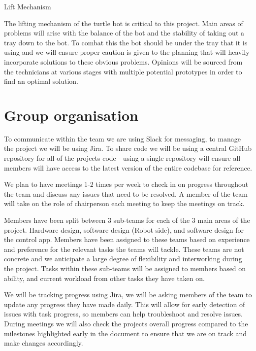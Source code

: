 \documentclass{article}
\begin{document}
Lift Mechanism

The lifting mechanism of the turtle bot is critical to this project. Main areas of problems will arise with the balance of the bot and the stability of taking out a tray down to the bot. To combat this the bot should be under the tray that it is using and we will ensure proper caution is given to the planning that will heavily incorporate solutions to these obvious problems. Opinions will be sourced from the technicians at various stages with multiple potential prototypes in order to find an optimal solution.

\section{Group organisation}

To communicate within the team we are using Slack for messaging, to manage the project we will be using Jira. To share code we will be using a central GitHub repository for all of the projects code - using a single repository will ensure all members will have access to the latest version of the entire codebase for reference.

We plan to have meetings 1-2 times per week to check in on progress throughout the team and discuss any issues that need to be resolved. A member of the team will take on the role of chairperson each meeting to keep the meetings on track. 

Members have been split between 3 sub-teams for each of the 3 main areas of the project. Hardware design, software design (Robot side), and software design for the control app. Members have been assigned to these teams based on experience and preference for the relevant tasks the teams will tackle. These teams are not concrete and we anticipate a large degree of flexibility and interworking during the project. Tasks within these sub-teams will be assigned to members based on ability, and current workload from other tasks they have taken on. 

We will be tracking progress using Jira, we will be asking members of the team to update any progress they have made daily. This will allow for early detection of issues with task progress, so members can help troubleshoot and resolve issues. During meetings we will also check the projects overall progress compared to the milestones highlighted early in the document to ensure that we are on track and make changes accordingly.




\end{document}
